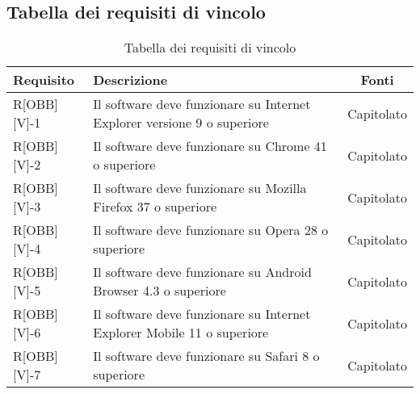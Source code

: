 \subsection{Tabella dei requisiti di vincolo}

\begin{center}
	\begin{table}[h]
	\begin{tabular}{|l|p{}|c|}
		\toprule
		
		\textbf{Requisito} & \textbf{Descrizione} & \textbf{Fonti} \\
		
		\midrule
		R[OBB][V]-1	& Il software deve funzionare su Internet Explorer versione 9 o superiore & Capitolato \\ \midrule
		R[OBB][V]-2 & Il software deve funzionare su Chrome 41 o superiore & Capitolato \\ \midrule
		R[OBB][V]-3 & Il software deve funzionare su Mozilla Firefox 37 o superiore & Capitolato  \\ \midrule
		R[OBB][V]-4	& Il software deve funzionare su Opera 28 o superiore & Capitolato \\ \midrule
		R[OBB][V]-5	& Il software deve funzionare su Android Browser 4.3 o superiore & Capitolato \\ \midrule
		R[OBB][V]-6	& Il software deve funzionare su Internet Explorer Mobile 11 o superiore & Capitolato \\ \midrule
		R[OBB][V]-7	& Il software deve funzionare su Safari 8 o superiore & Capitolato \\

		\bottomrule
		
	\end{tabular}
	\caption{Tabella dei requisiti di vincolo}
	
	\end{table}
	
\end{center}

\newpage

